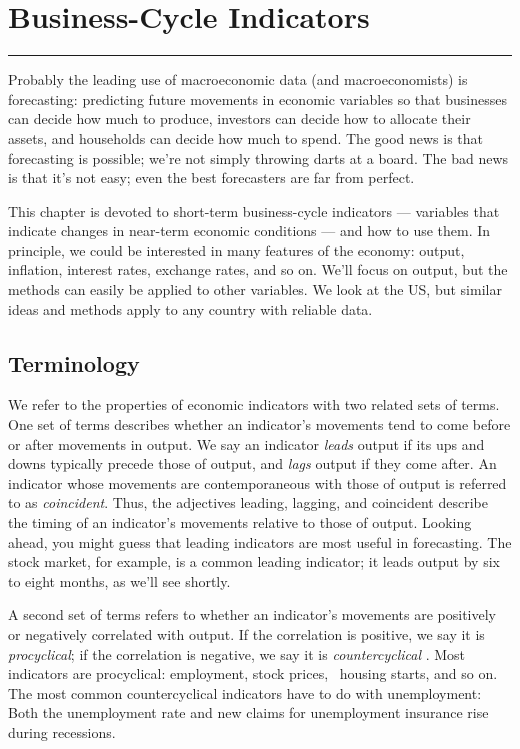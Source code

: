 \chapter{Business-Cycle Indicators}
\label{chp:bcin}
\hypertarget{indicators}{}


\rule{\textwidth}{1pt}

Probably the leading use of macroeconomic data (and macroeconomists)
is forecasting:  predicting future movements in economic variables
so that businesses can decide how much to produce,
investors can decide how to allocate their assets,
and households can decide how much to spend.
The good news is that forecasting is possible;
we're not simply throwing darts at a board.
The bad news is that it's not easy;
even the best forecasters are far from perfect.

This chapter is devoted to short-term business-cycle
indicators --- variables that indicate changes in near-term economic conditions --- and how to use them.
In principle, we could be interested in many features of
the economy:  output, inflation, interest rates,
exchange rates, and so on.
We'll focus on output, but the methods can easily be applied
to other variables.
We look at the US, but similar ideas and methods apply to
any country with reliable data.


\section{Terminology}

We refer to the properties of economic indicators with two related sets of terms.
One set of terms
describes whether an indicator's movements
tend to come before or after movements in output.
We say an indicator {\it leads\/}  output if
its ups and downs typically precede those of output,
and {\it lags\/}  output if they come after.
An indicator whose movements are contemporaneous with those of output
is referred to as {\it coincident\/}. 
Thus, the adjectives leading, lagging, and  coincident
describe the timing of an indicator's movements relative to those of output.
Looking ahead, you might guess that leading indicators are
most useful in forecasting.
The stock market, for example, is a common leading indicator;
it leads output by six to eight months, as we'll see shortly.


A second set of terms refers to
whether an indicator's movements
are positively or negatively correlated with output.
If the correlation is positive, we say it is {\it procyclical\/};
if the correlation is negative, we say it is {\it countercyclical
\/}.
Most indicators are procyclical:  employment, stock prices, \
housing starts, and so on.
The most common   countercyclical   
 indicators have to do with unemployment: Both the unemployment rate and new claims for unemployment insurance
 rise during recessions.

